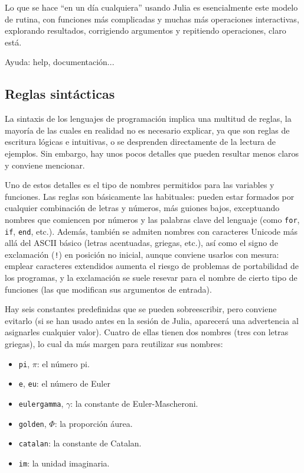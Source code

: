 ﻿\documentclass{article}
\newcommand{\jl}{\texttt}
\begin{document}
Lo que se hace ``en un día cualquiera'' usando Julia es esencialmente este modelo de rutina, con funciones más complicadas y muchas más operaciones interactivas, explorando resultados, corrigiendo argumentos y repitiendo operaciones, claro está.

Ayuda: help, documentación...

\subsection{Reglas sintácticas}

La sintaxis de los lenguajes de programación implica una multitud de reglas, la mayoría de las cuales en realidad no es necesario explicar, ya que son reglas de escritura lógicas e intuitivas, o se desprenden directamente de la lectura de ejemplos. Sin embargo, hay unos pocos detalles que pueden resultar menos claros y conviene mencionar.

Uno de estos detalles es el tipo de nombres permitidos para las variables y funciones. Las reglas son básicamente las habituales: pueden estar formados por cualquier combinación de letras y números, más guiones bajos, exceptuando nombres que comiencen por números y las palabras clave del lenguaje (como \jl{for}, \jl{if}, \jl{end}, etc.). Además, también se admiten nombres con caracteres Unicode más allá del ASCII básico (letras acentuadas, griegas, etc.), así como el signo de exclamación (\jl{!}) en posición no inicial, aunque conviene usarlos con mesura: emplear caracteres extendidos aumenta el riesgo de problemas de portabilidad de los programas, y la exclamación se suele resevar para el nombre de cierto tipo de funciones (las que modifican sus argumentos de entrada).

Hay seis constantes predefinidas que se pueden sobreescribir, pero conviene evitarlo (si se han usado antes en la sesión de Julia, aparecerá una advertencia al asignarles cualquier valor). Cuatro de ellas tienen dos nombres (tres con letras griegas), lo cual da más margen para reutilizar sus nombres:

\begin{itemize}
  \item \jl{pi}, \jl{$\pi$}: el número pi.
  \item \jl{e}, \jl{eu}: el número de Euler
  \item \jl{eulergamma}, \jl{$\gamma$}: la constante de Euler-Mascheroni.
  \item \jl{golden}, \jl{$\Phi$}: la proporción áurea.
  \item \jl{catalan}: la constante de Catalan.
  \item \jl{im}: la unidad imaginaria.
\end{itemize}
\end{document}
